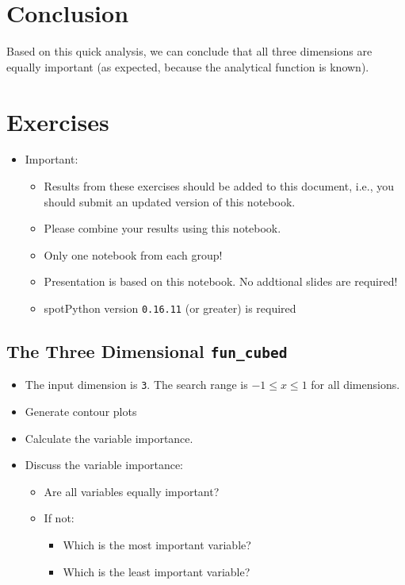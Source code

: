 \documentclass[
  letterpaper,
  DIV=11,
  numbers=noendperiod]{scrreprt}
\providecommand{\tightlist}{%
  \setlength{\itemsep}{0pt}\setlength{\parskip}{0pt}}\usepackage{longtable,booktabs,array}
\begin{document}
\hypertarget{conclusion}{%
\section{Conclusion}\label{conclusion}}

Based on this quick analysis, we can conclude that all three dimensions
are equally important (as expected, because the analytical function is
known).

\hypertarget{exercises-2}{%
\section{Exercises}\label{exercises-2}}

\begin{itemize}
\tightlist
\item
  Important:

  \begin{itemize}
  \tightlist
  \item
    Results from these exercises should be added to this document, i.e.,
    you should submit an updated version of this notebook.
  \item
    Please combine your results using this notebook.
  \item
    Only one notebook from each group!
  \item
    Presentation is based on this notebook. No addtional slides are
    required!
  \item
    spotPython version \texttt{0.16.11} (or greater) is required
  \end{itemize}
\end{itemize}

\hypertarget{the-three-dimensional-fun_cubed}{%
\subsection{\texorpdfstring{The Three Dimensional
\texttt{fun\_cubed}}{The Three Dimensional fun\_cubed}}\label{the-three-dimensional-fun_cubed}}

\begin{itemize}
\tightlist
\item
  The input dimension is \texttt{3}. The search range is
  \(-1 \leq x \leq 1\) for all dimensions.
\item
  Generate contour plots
\item
  Calculate the variable importance.
\item
  Discuss the variable importance:

  \begin{itemize}
  \tightlist
  \item
    Are all variables equally important?
  \item
    If not:

    \begin{itemize}
    \tightlist
    \item
      Which is the most important variable?
    \item
      Which is the least important variable?
    \end{itemize}
  \end{itemize}
\end{itemize}
\end{document}
